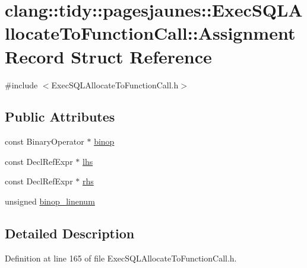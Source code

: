 \hypertarget{structclang_1_1tidy_1_1pagesjaunes_1_1_exec_s_q_l_allocate_to_function_call_1_1_assignment_record}{}\section{clang\+:\+:tidy\+:\+:pagesjaunes\+:\+:Exec\+S\+Q\+L\+Allocate\+To\+Function\+Call\+:\+:Assignment\+Record Struct Reference}
\label{structclang_1_1tidy_1_1pagesjaunes_1_1_exec_s_q_l_allocate_to_function_call_1_1_assignment_record}


{\ttfamily \#include $<$Exec\+S\+Q\+L\+Allocate\+To\+Function\+Call.\+h$>$}

\subsection*{Public Attributes}
\begin{DoxyCompactItemize}
\item 
const Binary\+Operator $\ast$ \hyperlink{structclang_1_1tidy_1_1pagesjaunes_1_1_exec_s_q_l_allocate_to_function_call_1_1_assignment_record_a8ad86a969839c9e895564af2e344e88c}{binop}
\item 
const Decl\+Ref\+Expr $\ast$ \hyperlink{structclang_1_1tidy_1_1pagesjaunes_1_1_exec_s_q_l_allocate_to_function_call_1_1_assignment_record_a6ececc1575b9aa12d63aaeedc07de373}{lhs}
\item 
const Decl\+Ref\+Expr $\ast$ \hyperlink{structclang_1_1tidy_1_1pagesjaunes_1_1_exec_s_q_l_allocate_to_function_call_1_1_assignment_record_ae2477e6caf7a823d614a35581a2c49de}{rhs}
\item 
unsigned \hyperlink{structclang_1_1tidy_1_1pagesjaunes_1_1_exec_s_q_l_allocate_to_function_call_1_1_assignment_record_ae640f46ee71e06fb096b0de8f39817ef}{binop\+\_\+linenum}
\end{DoxyCompactItemize}


\subsection{Detailed Description}


Definition at line 165 of file Exec\+S\+Q\+L\+Allocate\+To\+Function\+Call.\+h.



